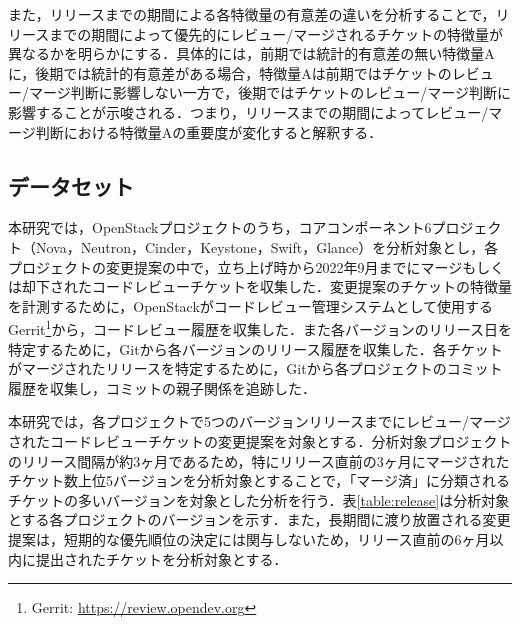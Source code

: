 \documentclass[submit]{ipsj}
\begin{document}
また，リリースまでの期間による各特徴量の有意差の違いを分析することで，リリースまでの期間によって優先的にレビュー/マージされるチケットの特徴量が異なるかを明らかにする．具体的には，前期では統計的有意差の無い特徴量Aに，後期では統計的有意差がある場合，特徴量Aは前期ではチケットのレビュー/マージ判断に影響しない一方で，後期ではチケットのレビュー/マージ判断に影響することが示唆される．つまり，リリースまでの期間によってレビュー/マージ判断における特徴量Aの重要度が変化すると解釈する．


\subsection{データセット}\label{sec:dataset}
本研究では，OpenStackプロジェクトのうち，コアコンポーネント6プロジェクト（Nova，Neutron，Cinder，Keystone，Swift，Glance）を分析対象とし，各プロジェクトの変更提案の中で，立ち上げ時から2022年9月までにマージもしくは却下されたコードレビューチケットを収集した．変更提案のチケットの特徴量を計測するために，OpenStackがコードレビュー管理システムとして使用するGerrit\footnote{Gerrit: \url{https://review.opendev.org}}から，コードレビュー履歴を収集した．また各バージョンのリリース日を特定するために，Gitから各バージョンのリリース履歴を収集した．各チケットがマージされたリリースを特定するために，Gitから各プロジェクトのコミット履歴を収集し，コミットの親子関係を追跡した．

本研究では，各プロジェクトで5つのバージョンリリースまでにレビュー/マージされたコードレビューチケットの変更提案を対象とする．分析対象プロジェクトのリリース間隔が約3ヶ月であるため，特にリリース直前の3ヶ月にマージされたチケット数上位5バージョンを分析対象とすることで，「マージ済」に分類されるチケットの多いバージョンを対象とした分析を行う．表\ref{table:release}は分析対象とする各プロジェクトのバージョンを示す．また，長期間に渡り放置される変更提案は，短期的な優先順位の決定には関与しないため，リリース直前の6ヶ月以内に提出されたチケットを分析対象とする．
\end{document}
